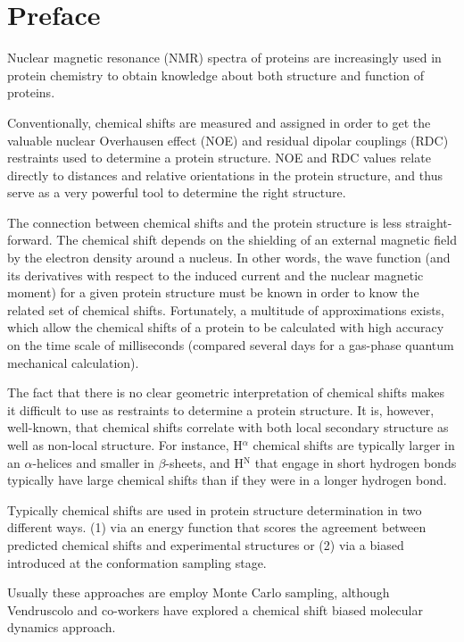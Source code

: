 \chapter*{Preface}

Nuclear magnetic resonance (NMR) spectra of proteins are increasingly used in protein chemistry to obtain knowledge about both structure and function of proteins.

Conventionally, chemical shifts are measured and assigned in order to get the valuable nuclear Overhausen effect (NOE) and residual dipolar couplings (RDC) restraints used to determine a protein structure. NOE and RDC values relate directly to distances and relative orientations in the protein structure, and thus serve as a very powerful tool to determine the right structure.

The connection between chemical shifts and the protein structure is less straight-forward.
The chemical shift depends on the shielding of an external magnetic field by the electron density around a nucleus.
In other words, the wave function (and its derivatives with respect to the induced current and the nuclear magnetic moment) for a given protein structure must be known in order to know the related set of chemical shifts.
Fortunately, a multitude of approximations exists, which allow the chemical shifts of a protein to be calculated with high accuracy on the time scale of milliseconds (compared several days for a gas-phase quantum mechanical calculation).

The fact that there is no clear geometric interpretation of chemical shifts makes it difficult to use as restraints to determine a protein structure.
It is, however, well-known, that chemical shifts correlate with both local secondary structure as well as non-local structure. For instance, H$^\alpha$ chemical shifts are typically larger in an $\alpha$-helices and smaller in $\beta$-sheets, and H$^\mathrm{N}$ that engage in short hydrogen bonds typically have large chemical shifts than if they were in a longer hydrogen bond.

Typically chemical shifts are used in protein structure determination in two different ways.
(1) via an energy function that scores the agreement between predicted chemical shifts and experimental structures or (2) via a biased introduced at the conformation sampling stage.

Usually these approaches are employ Monte Carlo sampling, although Vendruscolo and co-workers have explored a chemical shift biased molecular dynamics approach.






